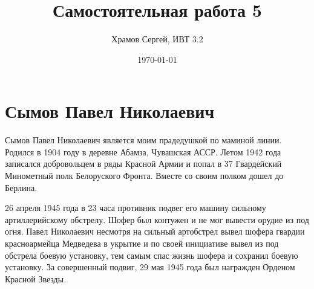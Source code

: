 \documentclass[a4paper,12pt]{article} %
\author{Храмов Сергей, ИВТ 3.2}
\title{Самостоятельная работа 5}
\date{\today}
\begin{document}
\maketitle
\newpage
\section*{Сымов Павел Николаевич}


\parindent=1cm
\hspace*{1cm} Сымов Павел Николаевич является моим прадедушкой по маминой линии. Родился в 1904 году в деревне Абамза, Чувашская АССР. Летом 1942 года записался добровольцем в ряды Красной Армии и попал в 37 Гвардейский Минометный полк Белоруского Фронта. Вместе со своим полком дошел до Берлина. 

26 апреля 1945 года в 23 часа противник подвег его машину сильному артиллерийскому обстрелу. Шофер был контужен и не мог вывести орудие из под огня. Павел Николаевич несмотря на сильный артобстрел вывел шофера гвардии красноармейца Медведева в укрытие и по своей инициативе вывел из под обстрела боевую установку, тем самым спас жизнь шофера и сохранил боевую установку. За совершенный подвиг, 29 мая 1945 года был  награжден Орденом Красной Звезды.
\end{document}
